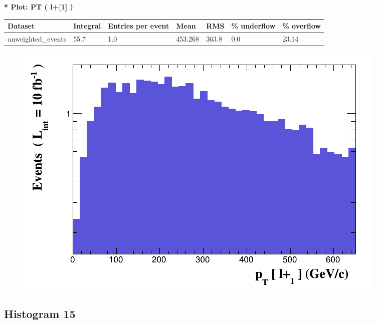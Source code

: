 \documentclass[a4paper, 10pt]{article}
\begin{document}
\textbf{* Plot: PT ( l+[1] ) }\\
   \begin{table}[H]
  \begin{center}
    \begin{tabular}{|m{23.0mm}|m{23.0mm}|m{18.0mm}|m{19.0mm}|m{19.0mm}|m{19.0mm}|m{19.0mm}|}
      \hline
      {\cellcolor{yellow}         Dataset}& {\cellcolor{yellow}         Integral}& {\cellcolor{yellow}         Entries per event}& {\cellcolor{yellow}         Mean}& {\cellcolor{yellow}         RMS}& {\cellcolor{yellow}         \% underflow}& {\cellcolor{yellow}         \% overflow}\\
      \hline
      {\cellcolor{white}         unweighted\_events}& {\cellcolor{white}         55.7}& {\cellcolor{white}         1.0}& {\cellcolor{white}         453.268}& {\cellcolor{white}         363.8}& {\cellcolor{red}         0.0}& {\cellcolor{red}         23.14}\\
\hline
    \end{tabular}
  \end{center}
\end{table}

\begin{figure}[H]
  \begin{center}
    \includegraphics[scale=0.45]{selection_13.png}\\
\caption{   }
  \end{center}
\end{figure}
      \newpage
\subsection{ Histogram 15}
\end{document}
